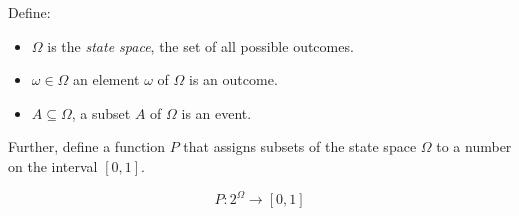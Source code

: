 Define: 

\begin{itemize}
\item $\Omega$ is the \textit{state space}, the set of all possible outcomes. 
\item $\omega \in \Omega$ an element $\omega$ of $\Omega$ is an outcome.
\item $A \subseteq \Omega$, a subset $A$ of $\Omega$ is an event.
\end{itemize}

Further, define a function $P$ that assigns subsets of the state space $\Omega$ to a number on the interval $[0,1]$. 

\begin{equation}
P: 2^{\Omega} \rightarrow [0,1]
\end{equation}

